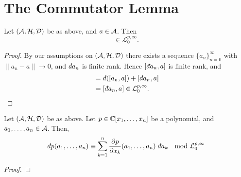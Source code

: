 \section{The Commutator Lemma}
\begin{lemma}
    Let $(\mathcal{A},\mathcal{H},\mathcal{D})$ be as above, and $a \in \mathcal{A}$. Then
    \begin{equation*}
        [\qd a,a] \in \mathcal{L}^{p,\infty}_0.
    \end{equation*}
\end{lemma}
\begin{proof}
    By our assumptions on $(\mathcal{A},\mathcal{H},\mathcal{D})$ there exists a sequence $\{a_n\}_{n=0}^\infty$
    with $\|a_n-a\| \rightarrow 0$, and 
    $\qd a_n$ is finite rank. Hence $[\qd a_n,a]$ is finite rank, and
    \begin{align}
        [\qd a,a_n] &= \qd([a_n,a]) + [\qd a_n,a]\\
                    &= [\qd a_n,a] \in \mathcal{L}^{p,\infty}_0.
    \end{align}
\end{proof}

\begin{lemma}
    Let $(\mathcal{A},\mathcal{H},\mathcal{D})$ be as above. Let $p \in \mathbb{C}[x_1,\ldots,x_n]$ be a polynomial,
    and $a_1,\ldots,a_n \in \mathcal{A}$. 
    Then,
    \begin{equation}
        \qd p(a_1,\ldots,a_n) \equiv \sum_{k=1}^n \frac{\partial p}{\partial x_k}(a_1,\ldots,a_n)\;\qd a_k\; \mod{\mathcal{L}^{p,\infty}_0}
    \end{equation}
\end{lemma}
\begin{proof}
    
\end{proof}

